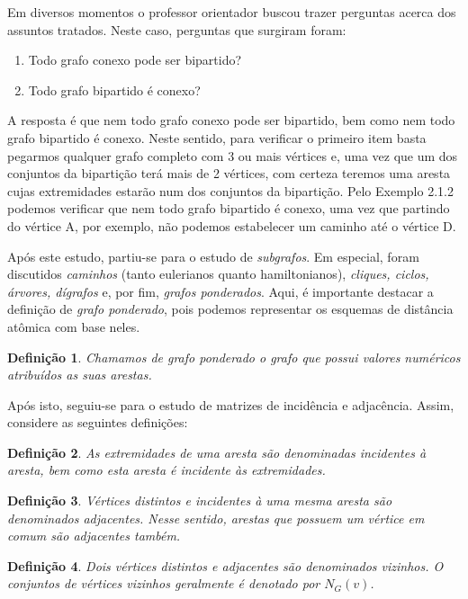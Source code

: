 \documentclass[
	12pt,				%
	openright,			%
	twoside,			%
	a4paper,			%
	english,			%
	french,				%
	spanish,			%
	brazil				%
	]{abntex2}
\newtheorem{definicao}{Definição}[section]
\begin{document}
Em diversos momentos o professor orientador buscou trazer perguntas acerca dos assuntos tratados. Neste caso, perguntas que surgiram foram:
\begin{enumerate}
\item Todo grafo conexo pode ser bipartido?
\item Todo grafo bipartido é conexo?
\end{enumerate}
A resposta é que nem todo grafo conexo pode ser bipartido, bem como nem todo grafo bipartido é conexo. Neste sentido, para verificar o primeiro item basta pegarmos qualquer grafo completo com 3 ou mais vértices e, uma vez que um dos conjuntos da bipartição terá mais de 2 vértices, com certeza teremos uma aresta cujas extremidades estarão num dos conjuntos da bipartição. Pelo Exemplo 2.1.2 podemos verificar que nem todo grafo bipartido é conexo, uma vez que partindo do vértice A, por exemplo, não podemos estabelecer um caminho até o vértice D.

Após este estudo, partiu-se para o estudo de \textit{subgrafos}. Em especial, foram discutidos \textit{caminhos} (tanto eulerianos quanto hamiltonianos), \textit{cliques, ciclos, árvores, dígrafos} e, por fim, \textit{grafos ponderados}. Aqui, é importante destacar a definição de \textit{grafo ponderado}, pois podemos representar os esquemas de distância atômica com base neles.

\begin{definicao}
Chamamos de \textit{grafo ponderado} o grafo que possui valores numéricos atribuídos as suas arestas.
\end{definicao}

Após isto, seguiu-se para o estudo de matrizes de incidência e adjacência. Assim, considere as seguintes definições:

\begin{definicao}
As extremidades de uma aresta são denominadas \textit{incidentes} à aresta, bem como esta aresta é \textit{incidente} às \textit{extremidades}.
\end{definicao}

\begin{definicao}
Vértices distintos e incidentes à uma mesma aresta são denominados \textit{adjacentes}. Nesse sentido, arestas que possuem um vértice em comum são \textit{adjacentes} também.
\end{definicao}

\begin{definicao}
Dois vértices distintos e adjacentes são denominados \textit{vizinhos}. O conjuntos de vértices \textit{vizinhos} geralmente é denotado por $N_{G}(v)$.
\end{definicao}
\end{document}
